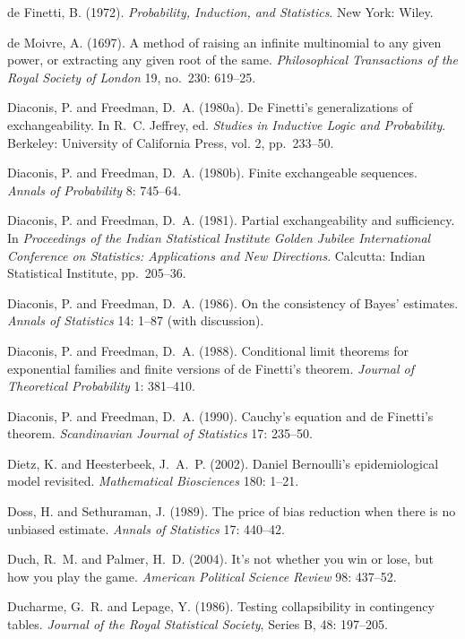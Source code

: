 \smallskip\noindent
de Finetti, B. (1972).
{\it Probability, Induction, and Statistics\/}.
New York: Wiley.

\smallskip\noindent
de Moivre, A. (1697).
A method of raising an infinite multinomial to any given power, or extracting any given root of the same.
{\it Philosophical Transactions of the Royal Society of London\/} {19}, no.~230: 619--25.

\smallskip\noindent
Diaconis, P. and Freedman, D.~A. (1980a).
De Finetti's generalizations of exchangeability.
In R.~C. Jeffrey, ed. {\it Studies in Inductive Logic and Probability\/}.
Berkeley: University of California Press, vol. 2, pp.~233--50.

\smallskip\noindent
Diaconis, P. and Freedman, D.~A. (1980b).
Finite exchangeable sequences.
{\it Annals of Probability\/} 8: 745--64.

\smallskip\noindent
Diaconis, P. and Freedman, D.~A. (1981).
Partial exchangeability and sufficiency.
In {\it Proceedings of the Indian Statistical Institute Golden Jubilee International Conference on Statistics:
Applications and New Directions\/}.
Calcutta: Indian Statistical Institute, pp.~205--36.

\smallskip\noindent
Diaconis, P. and Freedman, D.~A. (1986).
On the consistency of Bayes' estimates.
{\it Annals of Statistics\/} 14: 1--87 (with discussion).

\smallskip\noindent
Diaconis, P. and Freedman, D.~A. (1988).
Conditional limit theorems for exponential families and finite versions of de Finetti's theorem.
{\it Journal of Theoretical Probability\/} 1: 381--410.

\smallskip\noindent
Diaconis, P. and Freedman, D.~A. (1990).
Cauchy's equation and de Finetti's theorem.
{\it Scandinavian Journal of Statistics\/} 17: 235--50.

\smallskip\noindent
Dietz, K. and Heesterbeek, J.~A.~P. (2002).
Daniel Bernoulli's epidemiological model revisited.
{\it Mathematical Biosciences\/} 180: 1--21.

\smallskip\noindent
Doss, H. and Sethuraman, J. (1989).
The price of bias reduction when there is no unbiased estimate.
{\it Annals of Statistics\/} 17: 440--42.

\smallskip\noindent
Duch, R.~M. and Palmer, H.~D. (2004).
It's not whether you win or lose, but how you play the game.
{\it American Political Science Review\/} {98}: 437--52.

\smallskip\noindent
Ducharme, G.~R. and Lepage, Y. (1986).
Testing collapsibility in contingency tables.
{\it Journal of the Royal Statistical Society\/}, Series B, {48}: 197--205.

